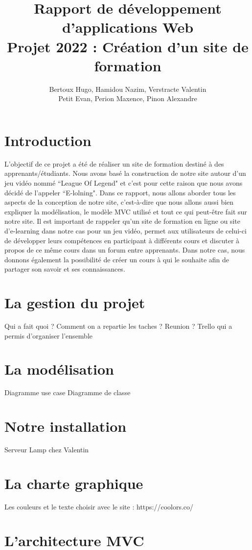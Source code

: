 \documentclass[a4paper,10pt]{article}
\title{
Rapport de développement d'applications Web\\
Projet 2022 : Création d'un site de formation
}
\author{
Bertoux Hugo, Hamidou Nazim, Verstracte Valentin\\
Petit Evan, Perion Maxence, Pinon Alexandre
}
\date{}
\begin{document}
\maketitle 
\tableofcontents

\newpage
\section{Introduction}
L'objectif de ce projet a été de réaliser un site de formation destiné à des apprenants/étudiants. Nous avons basé la construction de notre site autour d'un jeu vidéo nommé ``League Of Legend" et c'est pour cette raison que nous avons décidé de l'appeler ``E-lolning". 
Dans ce rapport, nous allons aborder tous les aspects de la conception de notre site, c'est-à-dire que nous allons aussi bien expliquer la modélisation, le modèle MVC utilisé et tout ce qui peut-être fait sur notre site. Il est important de rappeler qu'un site de formation en ligne ou site d'e-learning dans notre cas pour un jeu vidéo, permet aux utilisateurs de celui-ci de développer leurs compétences en participant à différents cours et discuter à propos de ce même cours dans un forum entre apprenants. Dans notre cas, nous donnons également la possibilité de créer un cours à qui le souhaite afin de partager son savoir et ses connaissances. 

\section{La gestion du projet}
Qui a fait quoi ? Comment on a repartie les taches ? Reunion ? Trello qui a permis d'organiser l'ensemble

\section{La modélisation}
Diagramme use case
Diagramme de classe

\section{Notre installation}
Serveur Lamp chez Valentin

\section{La charte graphique}
Les couleurs et le texte choisir avec le site : https://coolors.co/

\section{L'architecture MVC}
\end{document}

